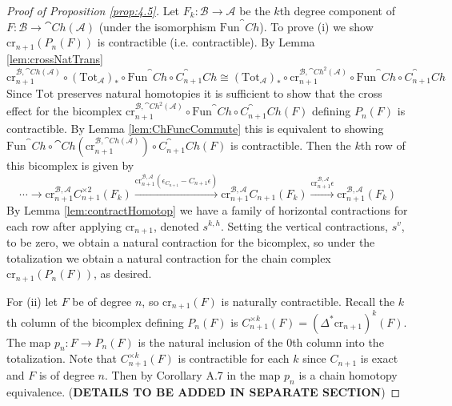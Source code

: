 \begin{proof}[Proof of Proposition \ref{prop:4.5}]
    Let $F_k:\mathcal{B}\rightarrow \mathcal{A}$ be the $k$th degree component of $F:\mathcal{B}\rightarrow \cat{Ch}(\mathcal{A})$ (under the isomorphism $\text{Fun}^\cat{Ch}$). To prove (i) we show $\text{cr}_{n+1}(P_n(F))$ is contractible (i.e.  contractible). By Lemma \ref{lem:crossNatTrans} 
    \begin{equation*}
        \text{cr}_{n+1}^{\mathcal{B},\cat{Ch}(\mathcal{A})}\circ (\text{Tot}_\mathcal{A})_*\circ \text{Fun}^\cat{Ch}\circ C_{n+1}^\cat{Ch} \cong (\text{Tot}_\mathcal{A})_*\circ \text{cr}_{n+1}^{\mathcal{B},\cat{Ch}^2(\mathcal{A})}\circ \text{Fun}^\cat{Ch}\circ C_{n+1}^\cat{Ch}
    \end{equation*}
    Since $\text{Tot}$ preserves natural homotopies it is sufficient to show that the cross effect for the bicomplex $\text{cr}_{n+1}^{\mathcal{B},\cat{Ch}^2(\mathcal{A})}\circ \text{Fun}^\cat{Ch}\circ C_{n+1}^\cat{Ch}(F)$ defining $P_n(F)$ is contractible. By Lemma \ref{lem:ChFuncCommute} this is equivalent to showing $\text{Fun}^\cat{Ch}\circ\cat{Ch}(\text{cr}_{n+1}^{\mathcal{B},\cat{Ch}(\mathcal{A})})\circ C_{n+1}^\cat{Ch}(F)$ is contractible. Then the $k$th row of this bicomplex is given by
    \begin{equation*}
        \cdots \rightarrow\text{cr}_{n+1}^{\mathcal{B},\mathcal{A}}C_{n+1}^{\times2}(F_k)\xrightarrow{\text{cr}_{n+1}^{\mathcal{B},\mathcal{A}}(\epsilon_{C_{n+1}}-C_{n+1}\epsilon)}\text{cr}_{n+1}^{\mathcal{B},\mathcal{A}}C_{n+1}(F_k)\xrightarrow{\text{cr}_{n+1}^{\mathcal{B},\mathcal{A}}\epsilon}\text{cr}_{n+1}^{\mathcal{B},\mathcal{A}}(F_k)
    \end{equation*}
    By Lemma \ref{lem:contractHomotop} we have a family of horizontal contractions for each row after applying $\text{cr}_{n+1}$, denoted $s^{k,h}$. Setting the vertical contractions, $s^v$, to be zero, we obtain a natural contraction for the bicomplex, so under the totalization we obtain a natural contraction for the chain complex $\text{cr}_{n+1}(P_n(F))$, as desired.

    \vspace{10pt}

    For (ii) let $F$ be of degree $n$, so $\text{cr}_{n+1}(F)$ is naturally contractible. Recall the $k$th column of the bicomplex defining $P_n(F)$ is $C_{n+1}^{\times k}(F) = (\Delta^*\text{cr}_{n+1})^k(F)$. The map $p_n:F\rightarrow P_n(F)$ is the natural inclusion of the $0$th column into the totalization. Note that $C_{n+1}^{\times k}(F)$ is contractible for each $k$ since $C_{n+1}$ is exact and $F$ is of degree $n$. Then by Corollary A.7 in \cite{BJORT} the map $p_n$ is a  chain homotopy equivalence. (\textbf{DETAILS TO BE ADDED IN SEPARATE SECTION})


\end{proof}

